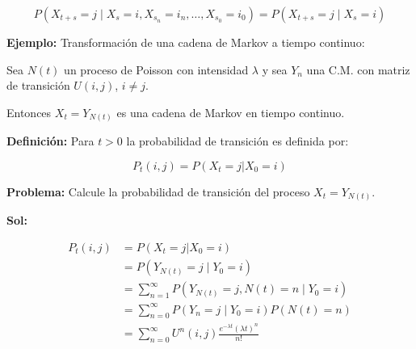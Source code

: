 \documentclass[12pt]{article}
\begin{document}
\begin{equation*}
P\left(X_{t+s} = j \mid X_s = i, X_{s_n} = i_n, \ldots, X_{s_0} = i_0\right) = P(X_{t+s} = j \mid X_s = i)
\end{equation*}

\textbf{Ejemplo:} Transformación de una cadena de Markov a tiempo continuo:

Sea $N(t)$ un proceso de Poisson con intensidad $\lambda$ y sea $Y_n$ una C.M. con matriz de transición $U(i,j)$, $i \neq j$.

Entonces $X_t = Y_{N(t)}$ es una cadena de Markov en tiempo continuo.

\begin{center}
\end{center}

\begin{center}
\end{center}

\textbf{Definición:} Para $t > 0$ la probabilidad de transición es definida por:

\begin{equation*}
P_t(i,j) = P(X_t = j | X_0 = i)
\end{equation*}

\textbf{Problema:} Calcule la probabilidad de transición del proceso $X_t = Y_{N(t)}$.

\textbf{Sol:}

\begin{align*}
P_t(i,j) &= P(X_t = j | X_0 = i) \\
&= P\left(Y_{N(t)} = j \mid Y_0 = i\right) \\
&= \sum_{n=1}^{\infty} P\left(Y_{N(t)} = j, N(t) = n \mid Y_0 = i\right) \\
&= \sum_{n=0}^{\infty} P\left(Y_n = j \mid Y_0 = i\right) P(N(t) = n) \\
&= \sum_{n=0}^{\infty} U^n(i,j) \frac{e^{-\lambda t}(\lambda t)^n}{n!}
\end{align*}
\end{document}
